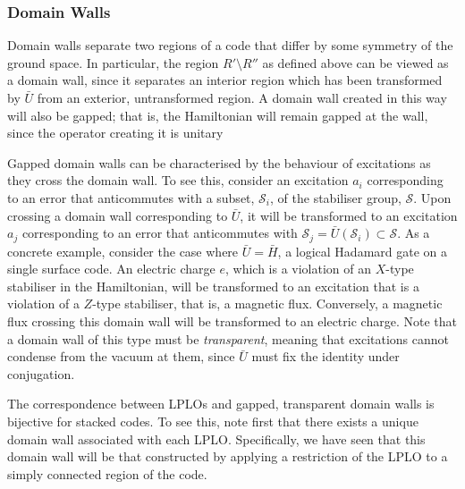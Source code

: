 \documentclass[pra,twocolumn,a4paper,nofootinbib]{revtex4-1}
\begin{document}
\subsubsection{Domain Walls}

Domain walls separate two regions of a code that differ by some symmetry of the ground space. In particular, the region $R' \setminus R''$ as defined above can be viewed as a domain wall, since it separates an interior region which has been transformed by $\bar{U}$ from an exterior, untransformed region.	A domain wall created in this way will also be gapped; that is, the Hamiltonian will remain gapped at the wall, since the operator creating it is unitary

Gapped domain walls can be characterised by the behaviour of excitations as they cross the domain wall. {To see this, consider an excitation $a_i$ corresponding to an error that anticommutes with a subset, $\mathcal{S}_i$, of the stabiliser group, $\mathcal{S}$. Upon crossing a domain wall corresponding to $\bar{U}$, it will be transformed to an excitation $a_j$ corresponding to an error that anticommutes with $\mathcal{S}_j = \bar{U}\left(\mathcal{S}_i\right) \subset \mathcal{S}$.} As a concrete example, consider the case where $\bar{U}=\bar{H}$, a logical Hadamard gate on a single surface code. An electric charge $e$, which is a violation of an $X$-type stabiliser in the Hamiltonian, will be transformed to an excitation that is a violation of a $Z$-type stabiliser, that is, a magnetic flux.  Conversely, a magnetic flux crossing this domain wall will be transformed to an electric charge. Note that a domain wall of this type must be \emph{transparent}, meaning that excitations cannot condense from the vacuum at them, since $\bar{U}$ must fix the identity under conjugation. 

The correspondence between LPLOs and gapped, transparent domain walls is bijective for stacked codes. To see this, note first that there exists a unique domain wall associated with each LPLO. Specifically, we have seen that this domain wall will be that constructed by applying a restriction of the LPLO to a simply connected region of the code.
\end{document}
